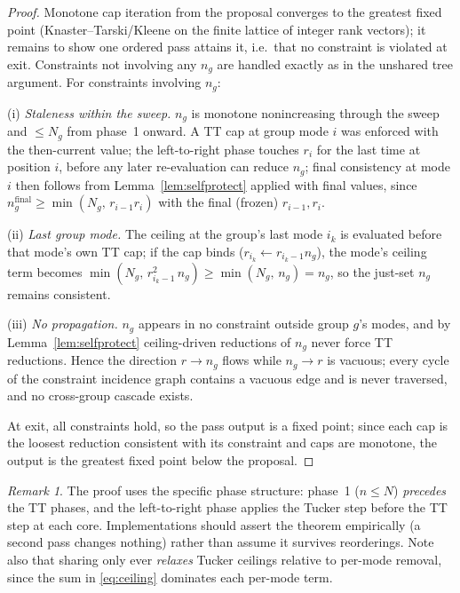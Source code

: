\documentclass[11pt]{article}
\theoremstyle{definition}
\theoremstyle{remark}
\newtheorem{remark}[theorem]{Remark}
\begin{document}
\begin{proof}
Monotone cap iteration from the proposal converges to the greatest fixed
point (Knaster--Tarski/Kleene on the finite lattice of integer rank vectors);
it remains to show one ordered pass attains it, i.e.\ that no constraint is
violated at exit. Constraints not involving any $n_g$ are handled exactly as
in the unshared tree argument. For constraints involving $n_g$:

(i) \emph{Staleness within the sweep.} $n_g$ is monotone nonincreasing
through the sweep and $\leq N_g$ from phase~1 onward. A TT cap at group mode
$i$ was enforced with the then-current value; the left-to-right phase touches
$r_i$ for the last time at position $i$, before any later re-evaluation can
reduce $n_g$; final consistency at mode $i$ then follows from
Lemma~\ref{lem:selfprotect} applied with final values, since
$n_g^{\mathrm{final}} \geq \min(N_g,\, r_{i-1} r_i)$ with the final (frozen)
$r_{i-1}, r_i$.

(ii) \emph{Last group mode.} The ceiling at the group's last mode $i_k$ is
evaluated before that mode's own TT cap; if the cap binds
($r_{i_k} \leftarrow r_{i_k-1} n_g$), the mode's ceiling term becomes
$\min(N_g,\, r_{i_k-1}^2\, n_g) \geq \min(N_g,\, n_g) = n_g$, so the just-set
$n_g$ remains consistent.

(iii) \emph{No propagation.} $n_g$ appears in no constraint outside group
$g$'s modes, and by Lemma~\ref{lem:selfprotect} ceiling-driven reductions of
$n_g$ never force TT reductions. Hence the direction
$r \to n_g$ flows while $n_g \to r$ is vacuous; every cycle of the constraint
incidence graph contains a vacuous edge and is never traversed, and no
cross-group cascade exists.

At exit, all constraints hold, so the pass output is a fixed point; since
each cap is the loosest reduction consistent with its constraint and caps are
monotone, the output is the greatest fixed point below the proposal.
\end{proof}

\begin{remark}
The proof uses the specific phase structure: phase~1 ($n \leq N$)
\emph{precedes} the TT phases, and the left-to-right phase applies the Tucker
step before the TT step at each core. Implementations should assert the
theorem empirically (a second pass changes nothing) rather than assume it
survives reorderings. Note also that sharing only ever \emph{relaxes} Tucker
ceilings relative to per-mode removal, since the sum in \eqref{eq:ceiling}
dominates each per-mode term.
\end{remark}
\end{document}
